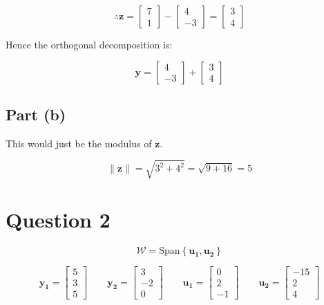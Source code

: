 \documentclass{article}
\begin{document}
\[%
     \therefore 
     \mathbf{z}
     =
     \begin{bmatrix} 7\\1 \end{bmatrix}
     -
     \begin{bmatrix} 4\\-3 \end{bmatrix}
     =
     \begin{bmatrix} 3\\4 \end{bmatrix}
\]%

Hence the orthogonal decomposition is:

\[%
    \mathbf{y}=
    \begin{bmatrix} 4\\-3 \end{bmatrix}
    +
    \begin{bmatrix} 3\\4 \end{bmatrix}
\]%

\subsection{Part (b)} 
This would just be the modulus of $\mathbf{z}$.

\[%
    \|\mathbf{z}\|
    =
    \sqrt{3^{2}+4^{2}}
    =
    \sqrt{9+16}
    =
    5
\]%

\section{Question 2} 


\[%
    \mathcal{W} = \text{Span} \left\{ \mathbf{u_1}, \mathbf{u_2} \right\}
\]%


\[%
    \mathbf{y_1}
    =
    \begin{bmatrix} 5\\3\\5 \end{bmatrix}
    \qquad
    \mathbf{y_2}
    =
    \begin{bmatrix} 3\\-2\\ 0 \end{bmatrix}
    \qquad
    \mathbf{u_1}
    =
    \begin{bmatrix}0\\2\\-1\end{bmatrix}
    \qquad
    \mathbf{u_2}
    =
    \begin{bmatrix}-15\\2\\4\end{bmatrix}
\]%
\end{document}
